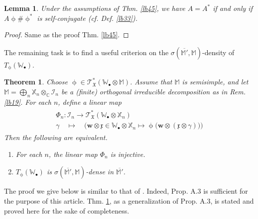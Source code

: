 \documentclass[11pt,b5paper,notitlepage]{article}
\theoremstyle{definition}
\theoremstyle{plain}
\newtheorem{thm}[df]{Theorem}
\newtheorem{lm}[df]{Lemma}
\newcommand{\fk}{\mathfrak}
\newcommand{\mc}{\mathcal}
\newcommand{\ovl}{\overline}
\newcommand{\scr}{\mathscr}
\newcommand{\blt}{\bullet}
\newcommand{\Xbb}{\mathbb X}
\newcommand{\Wbb}{\mathbb W}
\newcommand{\Mbb}{\mathbb M}
\newcommand{\Cbb}{\mathbb C}
\newcommand{\wbf}{\mathbf w}
\numberwithin{equation}{section}
\begin{document}
\begin{lm}\label{lb70}
Under the assumptions of Thm. \ref{lb45}, we have $A=A^*$ if and only if $A\upphi\#\upphi^*$ is self-conjugate (cf. Def. \ref{lb33}).
\end{lm}

\begin{proof}
Same as the proof Thm. \ref{lb45}.
\end{proof}


The remaining task is to find a useful criterion on the $\sigma(\ovl{\Mbb'},\Mbb)$-density of $T_\upphi(\Wbb_\blt)$.


\begin{thm}\label{lb21}
Choose $\upphi\in\scr T_{\fk X}^*(\Wbb_\blt\otimes\Mbb)$. Assume that $\Mbb$ is semisimple, and let  $\Mbb=\bigoplus_n\Xbb_n\otimes_\Cbb\mc I_n$ be a (finite) orthogonal irreducible decomposition as in Rem. \ref{lb19}. For each $n$, define a linear map
\begin{gather}
\begin{gathered}
\Phi_n: \mc I_n\rightarrow \scr T_{\fk X}^*(\Wbb_\blt\otimes\Xbb_n)\\
\gamma\quad\mapsto\quad \Big(\wbf\otimes \fk x\in\Wbb_\blt\otimes\Xbb_n\mapsto \upphi\big(\wbf\otimes (\fk x\otimes\gamma)\big)   \Big)
\end{gathered}
\end{gather}
Then the following are equivalent.
\begin{enumerate}[label=(\arabic*)]
\item For each $n$, the linear map $\Phi_n$ is injective.
\item $T_\upphi(\Wbb_\blt)$ is $\sigma(\ovl{\Mbb'},\Mbb)$-dense in $\ovl{\Mbb'}$.
\end{enumerate}
\end{thm}


The proof we give below is similar to that of \cite[Prop. A.3]{Gui19a}. Indeed, Prop. A.3 is sufficient for the purpose of this article. Thm. \ref{lb21}, as a generalization of Prop. A.3, is stated and proved here for the sake of completeness.
\end{document}

